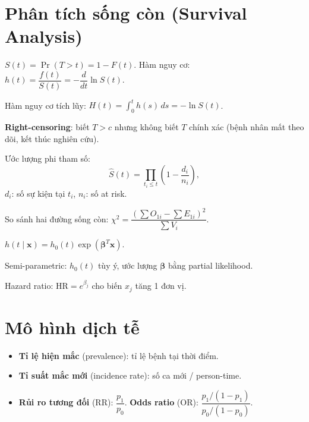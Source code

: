 \documentclass[12pt,a4paper]{article}
\begin{document}
\section{Phân tích sống còn (Survival Analysis)}

\begin{dinhnghia}[title={Hàm sống còn}]
  $S(t) = \Pr(T > t) = 1 - F(t)$. Hàm nguy cơ: $h(t) = \dfrac{f(t)}{S(t)} = -\dfrac{d}{dt}\ln S(t)$.

  Hàm nguy cơ tích lũy: $H(t) = \int_0^t h(s)\,ds = -\ln S(t)$.
\end{dinhnghia}

\begin{dinhnghia}[title={Censoring}]
  \textbf{Right-censoring}: biết $T > c$ nhưng không biết $T$ chính xác (bệnh nhân mất theo dõi, kết thúc nghiên cứu).
\end{dinhnghia}

\begin{phuongphap}[title={Kaplan--Meier}]
  Ước lượng phi tham số:
  \[
    \hat{S}(t) = \prod_{t_i \le t}\left(1 - \frac{d_i}{n_i}\right),
  \]
  $d_i$: số sự kiện tại $t_i$, $n_i$: số at risk.
\end{phuongphap}

\begin{phuongphap}[title={Log-rank test}]
  So sánh hai đường sống còn: $\chi^2 = \dfrac{(\sum O_{1i} - \sum E_{1i})^2}{\sum V_i}$.
\end{phuongphap}

\begin{dinhnghia}[title={Mô hình Cox (proportional hazards)}]
  $h(t \mid \mathbf{x}) = h_0(t)\exp(\boldsymbol{\beta}^T\mathbf{x})$.

  Semi-parametric: $h_0(t)$ tùy ý, ước lượng $\boldsymbol{\beta}$ bằng partial likelihood.

  Hazard ratio: $\text{HR} = e^{\beta_j}$ cho biến $x_j$ tăng 1 đơn vị.
\end{dinhnghia}

\section{Mô hình dịch tễ}

\begin{dinhnghia}[title={Các chỉ số dịch tễ}]
  \begin{itemize}
    \item \textbf{Tỉ lệ hiện mắc} (prevalence): tỉ lệ bệnh tại thời điểm.
    \item \textbf{Tỉ suất mắc mới} (incidence rate): số ca mới / person-time.
    \item \textbf{Rủi ro tương đối} (RR): $\dfrac{p_1}{p_0}$. \textbf{Odds ratio} (OR): $\dfrac{p_1/(1-p_1)}{p_0/(1-p_0)}$.
  \end{itemize}
\end{dinhnghia}
\end{document}
